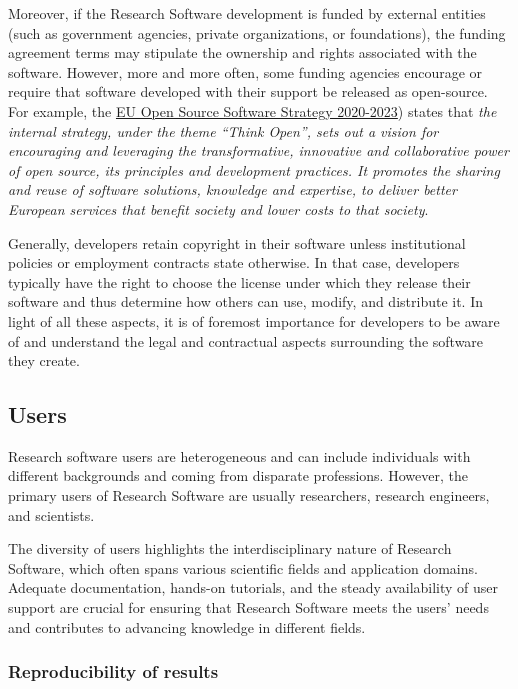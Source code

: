 Moreover, if the Research Software development is funded by external entities (such as government agencies, private organizations, or foundations), the funding agreement terms may stipulate the ownership and rights associated with the software. However, more and more often, some funding agencies encourage or require that software developed with their support be released as open-source. For example, the \href{https://commission.europa.eu/about-european-commission/departments-and-executive-agencies/digital-services/open-source-software-strategy_en}{EU Open Source Software Strategy 2020-2023}) states that \textit{the internal strategy, under the theme ``Think Open'', sets out a vision for encouraging and leveraging the transformative, innovative and collaborative power of open source, its principles and development practices. It promotes the sharing and reuse of software solutions, knowledge and expertise, to deliver better European services that benefit society and lower costs to that society}.

Generally, developers retain copyright in their software unless institutional policies or employment contracts state otherwise. In that case, developers typically have the right to choose the license under which they release their software and thus determine how others can use, modify, and distribute it. In light of all these aspects, it is of foremost importance for developers to be aware of and understand the legal and contractual aspects surrounding the software they create.

\subsection{Users}

Research software users are heterogeneous and can include individuals with different backgrounds and coming from disparate professions. However, the primary users of Research Software are usually researchers, research engineers, and scientists.

The diversity of users highlights the interdisciplinary nature of Research Software, which often spans various scientific fields and application domains. Adequate documentation, hands-on tutorials, and the steady availability of user support are crucial for ensuring that Research Software meets the users' needs and contributes to advancing knowledge in different fields.

\subsubsection*{Reproducibility of results}
\label{sec:user_repro_results}

